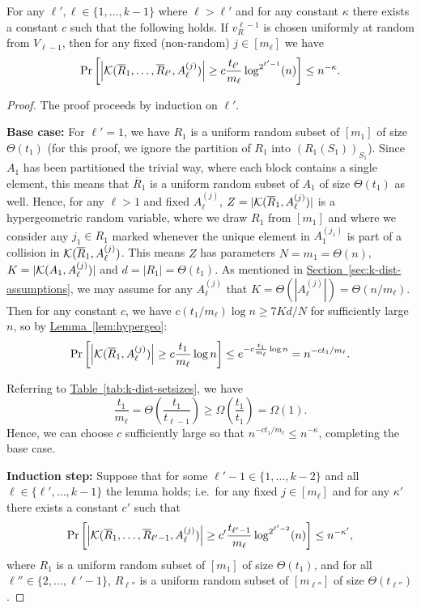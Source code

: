 \documentclass{article}
\renewcommand{\sec}[1]{\hyperref[sec:#1]{Section~\ref*{sec:#1}}}
\newcommand{\lem}[1]{\hyperref[lem:#1]{Lemma~\ref*{lem:#1}}}
\newcommand{\tabl}[1]{\hyperref[tab:#1]{Table~\ref*{tab:#1}}}
\renewcommand{\>}{\rangle}
\newcommand{\<}{\langle}
\renewcommand{\(}{\left(}
\renewcommand{\)}{\right)}
\def\abs#1{\left| #1 \right|}
\begin{document}
\begin{lemma}\label{lem:setup-probability}
For any $\ell',\ell \in \{1,\dots,k-1\}$ where $\ell > \ell'$ and for any constant $\kappa$ there exists a constant $c$ such that the following holds. 
If $v_{R}^{\ell-1}$ is chosen uniformly at random from $V_{\ell-1}$, then for any fixed (non-random) $j\in [m_{\ell}]$ we have 
	$$\Pr\left[\abs{{\cal K}(\overline{R}_1,\dots,\overline{R}_{\ell'},A_{\ell}^{(j)})}\geq c\frac{t_{\ell'}}{m_{\ell}}\log^{2^{\ell'-1}} (n)\right]\leq n^{-\kappa}.$$
\end{lemma}
\begin{proof}
	The proof proceeds by induction on $\ell'$.
	

\noindent\textbf{Base case:}
For $\ell'=1$, we have $R_1$ is a uniform random subset of $[m_1]$ of size $\Theta(t_1)$ (for this proof, we ignore the partition of $R_1$ into $(R_1(S_1))_{S_1}$). Since $A_1$ has been partitioned the trivial way, where each block contains a single element, this means that $\overline{R}_1$ is a uniform random subset of $A_1$ of size $\Theta(t_1)$ as well. Hence, for any $\ell>1$ and fixed $A_\ell^{(j)}$, $Z=|{\cal K}(\overline{R}_1, A_{\ell}^{(j)})|$ is a hypergeometric random variable, where we draw $R_1$ from $[m_1]$ and where we consider any $j_1 \in R_1$ marked whenever the unique element in $A_1^{(j_1)}$ is part of a collision in ${\cal K}(\overline{R}_1, A_{\ell}^{(j)})$. This means $Z$ has parameters $N=m_1= \Theta(n)$, $K=|{\cal K}(A_1, A_{\ell}^{(j)})|$ and $d=|R_1|= \Theta(t_1)$. As mentioned in \sec{k-dist-assumptions}, we may assume for any $A_{\ell}^{(j)}$ that $K = \Theta\left(\abs{A_{\ell}^{(j)}}\right) = \Theta(n/m_{\ell})$. Then for any constant $c$, we have $c(t_1/m_{\ell})\log n\geq 7Kd/N$ for sufficiently large $n$, so by \lem{hypergeo}:
$$ \Pr\left[\abs{{\cal K}(\overline{R}_1, A_{\ell}^{(j)})}\geq c\frac{t_1}{m_{\ell}}\log n\right]\leq e^{-c\frac{t_1}{m_{\ell}}\log n}=n^{-ct_1/m_{\ell}}.$$


\noindent Referring to \tabl{k-dist-setsizes}, we have
$$\frac{t_1}{m_{\ell}} = \Theta\left(\frac{t_1}{t_{\ell-1}}\right) \geq \Omega \left(\frac{t_1}{t_{1}}\right)= \Omega(1).$$
Hence, we can choose $c$ sufficiently large so that $n^{-ct_1/m_{\ell}}\leq n^{-\kappa}$, completing the base case.
	
\noindent\textbf{Induction step:}
Suppose that for some $\ell'-1 \in \{1,\dots,k-2\}$ and all $\ell \in \{\ell',\dots,k-1\}$ the lemma holds; i.e.~for any fixed $j \in [m_{\ell}]$ and for any $\kappa'$ there exists a constant $c'$ such that
$$\Pr\left[\abs{{\cal K}(\overline{R}_1,\dots,\overline{R}_{\ell'-1},A_{\ell}^{(j)})}\geq c'\frac{t_{\ell'-1}}{m_{\ell}}\log^{2^{\ell'-2}} (n)\right]\leq n^{-\kappa'},$$
where $R_1$ is a uniform random subset of $[m_1]$ of size $\Theta(t_1)$, and for all $\ell''\in\{2,\dots,\ell'-1\}$, $R_{\ell''}$ is a uniform random subset of $[m_{\ell''}]$ of size $\Theta(t_{\ell''})$.


\end{proof}
\end{document}

